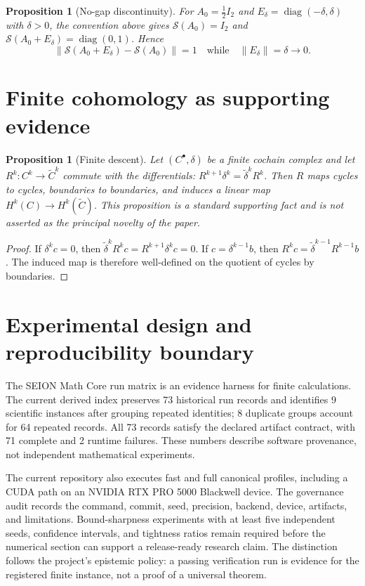\documentclass[11pt]{article}
\newtheorem{proposition}[theorem]{Proposition}
\newcommand{\norm}[1]{\left\lVert #1\right\rVert}
\begin{document}
\begin{proposition}[No-gap discontinuity]
\label{prop:nogap}
For $A_0=\tfrac12 I_2$ and $E_\delta=\operatorname{diag}(-\delta,\delta)$ with $\delta>0$, the convention above gives $\mathcal S(A_0)=I_2$ and $\mathcal S(A_0+E_\delta)=\operatorname{diag}(0,1)$. Hence
\[
    \norm{\mathcal S(A_0+E_\delta)-\mathcal S(A_0)}=1
    \quad\text{while}\quad \norm{E_\delta}=\delta\to0.
\]
\end{proposition}

\section{Finite cohomology as supporting evidence}

\begin{proposition}[Finite descent]
Let $(C^\bullet,\delta)$ be a finite cochain complex and let $R^k:C^k\to \widetilde C^k$ commute with the differentials: $R^{k+1}\delta^k=\widetilde\delta^kR^k$. Then $R$ maps cycles to cycles, boundaries to boundaries, and induces a linear map $H^k(C)\to H^k(\widetilde C)$. This proposition is a standard supporting fact and is not asserted as the principal novelty of the paper.
\end{proposition}

\begin{proof}
If $\delta^kc=0$, then $\widetilde\delta^kR^kc=R^{k+1}\delta^kc=0$. If $c=\delta^{k-1}b$, then $R^kc=\widetilde\delta^{k-1}R^{k-1}b$. The induced map is therefore well-defined on the quotient of cycles by boundaries.
\end{proof}

\section{Experimental design and reproducibility boundary}

The SEION Math Core run matrix is an evidence harness for finite calculations. The current derived index preserves 73 historical run records and identifies 9 scientific instances after grouping repeated identities; 8 duplicate groups account for 64 repeated records. All 73 records satisfy the declared artifact contract, with 71 complete and 2 runtime failures. These numbers describe software provenance, not independent mathematical experiments.

The current repository also executes fast and full canonical profiles, including a CUDA path on an NVIDIA RTX PRO 5000 Blackwell device. The governance audit records the command, commit, seed, precision, backend, device, artifacts, and limitations. Bound-sharpness experiments with at least five independent seeds, confidence intervals, and tightness ratios remain required before the numerical section can support a release-ready research claim. The distinction follows the project's epistemic policy: a passing verification run is evidence for the registered finite instance, not a proof of a universal theorem.
\end{document}
